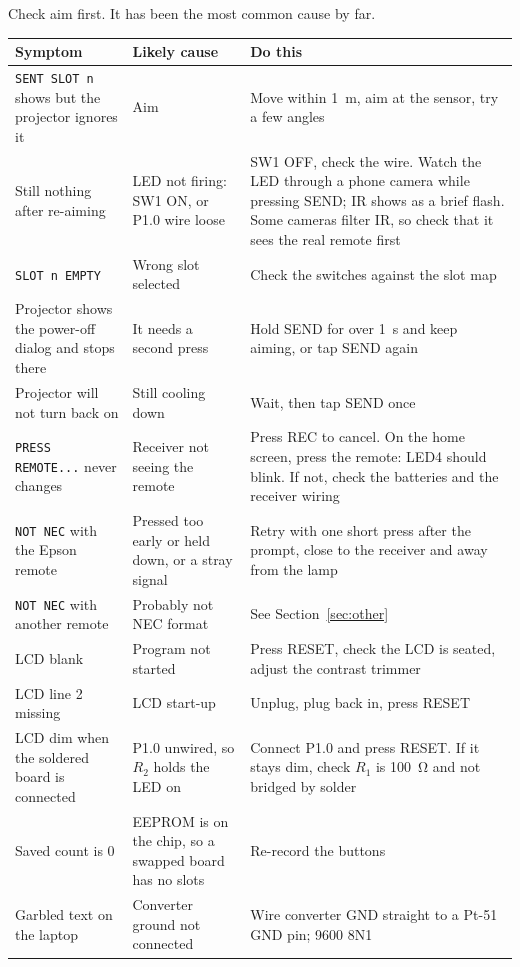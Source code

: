 \documentclass[11pt,a4paper]{article}
\newcommand{\code}[1]{\texttt{#1}}
\begin{document}
Check aim first. It has been the most common cause by far.

\begin{center}
\small
\begin{tabularx}{\textwidth}{@{}>{\raggedright\arraybackslash}p{4.3cm} L L@{}}
\toprule
Symptom & Likely cause & Do this\\
\midrule
\code{SENT SLOT n} shows but the projector ignores it & Aim & Move within \qty{1}{\metre}, aim at the sensor, try a few angles\\
Still nothing after re-aiming & LED not firing: SW1 ON, or P1.0 wire loose & SW1 OFF, check the wire. Watch the LED through a phone camera while pressing SEND; IR shows as a brief flash. Some cameras filter IR, so check that it sees the real remote first\\
\code{SLOT n EMPTY} & Wrong slot selected & Check the switches against the slot map\\
Projector shows the power-off dialog and stops there & It needs a second press & Hold SEND for over \qty{1}{\second} and keep aiming, or tap SEND again\\
Projector will not turn back on & Still cooling down & Wait, then tap SEND once\\
\code{PRESS REMOTE...} never changes & Receiver not seeing the remote & Press REC to cancel. On the home screen, press the remote: LED4 should blink. If not, check the batteries and the receiver wiring\\
\code{NOT NEC} with the Epson remote & Pressed too early or held down, or a stray signal & Retry with one short press after the prompt, close to the receiver and away from the lamp\\
\code{NOT NEC} with another remote & Probably not NEC format & See Section~\ref{sec:other}\\
LCD blank & Program not started & Press RESET, check the LCD is seated, adjust the contrast trimmer\\
LCD line 2 missing & LCD start-up & Unplug, plug back in, press RESET\\
LCD dim when the soldered board is connected & P1.0 unwired, so $R_2$ holds the LED on & Connect P1.0 and press RESET. If it stays dim, check $R_1$ is \qty{100}{\ohm} and not bridged by solder\\
Saved count is 0 & EEPROM is on the chip, so a swapped board has no slots & Re-record the buttons\\
Garbled text on the laptop & Converter ground not connected & Wire converter GND straight to a Pt-51 GND pin; 9600 8N1\\
\bottomrule
\end{tabularx}
\end{center}
\end{document}
